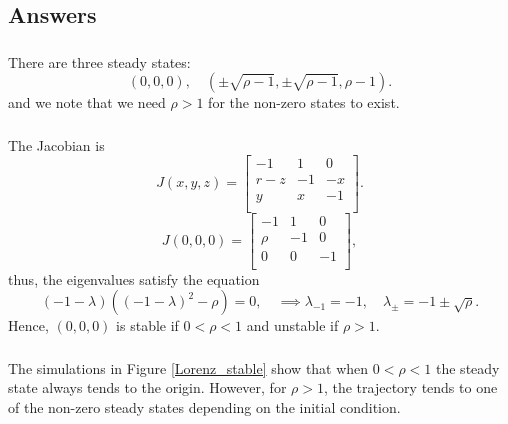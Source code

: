 \documentclass[]{article}
\newcommand{\bb}{\begin{equation}}
\newcommand{\ee}{\end{equation}}
\newcommand{\fig}[1]{Figure \ref{#1}}
\begin{document}
\begin{Answ}
\subsection{Answers}
\subsubsection{}
There are three steady states:
\bb
(0,0,0), \quad(\pm\sqrt{\rho-1},\pm\sqrt{\rho-1},\rho-1).
\ee
and we note that we need $\rho>1$ for the non-zero states to exist.
\subsubsection{}
The Jacobian is
\bb
J(x,y,z)=\left[ {\begin{array}{ccc}
   -1 & 1 & 0 \\
   r-z & -1 & -x \\
   y  & x & -1 \\
  \end{array} } \right].
\ee
\bb
J(0,0,0)=\left[ {\begin{array}{ccc}
   -1 & 1 & 0 \\
   \rho & -1 & 0 \\
   0 & 0 & -1 \\
  \end{array} } \right],
\ee
thus, the eigenvalues satisfy the equation
\bb
(-1-\lambda)((-1-\lambda)^2-\rho)=0,\quad \implies\lambda_{-1}=-1,\quad\lambda_{\pm}=-1\pm\sqrt{\rho}.
\ee
Hence, $(0,0,0)$ is stable if $0<\rho<1$ and unstable if $\rho>1$.
\subsubsection{}
The simulations in \fig{Lorenz_stable} show that when $0<\rho<1$ the steady state always tends to the origin. However, for $\rho>1$, the trajectory tends to one of the non-zero steady states depending on the initial condition.




\end{Answ}
\end{document}
